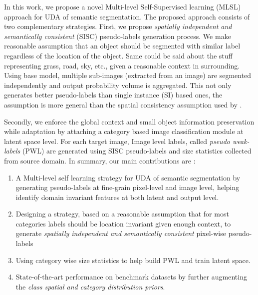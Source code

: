 \documentclass[10pt,twocolumn,letterpaper]{article}
\begin{document}
 






 
In this work, we propose a novel Multi-level Self-Supervised learning (MLSL)  approach for UDA of semantic segmentation. 
The proposed approach consists of two complementary strategies.
First, we propose \textit{spatially independent and semantically consistent} (SISC) pseudo-labels generation process. We make reasonable assumption that an object should be segmented with similar label regardless of the location of the object. Same could be said about the stuff representing grass, road, sky, etc., given a reasonable context in surrounding.  
Using base model, multiple sub-images (extracted from an image) are segmented independently and output probability volume is aggregated.
This not only generates better pseudo-labels than single instance (SI) based ones, the assumption is more general than the spatial consistency assumption used by \cite{zou2018unsupervised}.  


Secondly, we enforce the global context and small object information preservation while adaptation by attaching a category based image classification module at latent space level. 
For each target image, Image level labels, called \textit{pseudo weak-labels} (PWL) are generated using SISC pseudo-labels and size statistics collected from source domain.
In summary, our main contributions are :
\begin{enumerate}
\item A Multi-level self learning strategy for UDA of semantic segmentation by generating pseudo-labels at fine-grain pixel-level and image level, helping identify domain invariant features at both latent and output level. \item Designing a strategy, based on a reasonable assumption that for most categories labels should be location invariant given enough context, to generate \textit{spatially independent and semantically consistent} pixel-wise pseudo-labels 
\item Using category wise size statistics to help build PWL and train latent space. 
\item State-of-the-art performance on benchmark datasets by further augmenting the \textit{class spatial and category distribution priors}.
\end{enumerate}
\end{document}
